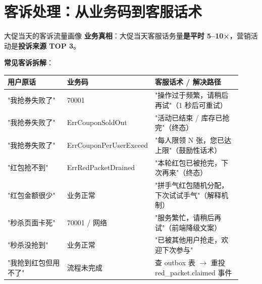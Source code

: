\documentclass[aspectratio=169,11pt]{beamer}
\begin{document}
\section{客诉处理：从业务码到客服话术}

\begin{frame}[shrink]{大促当天的客诉流量画像}
\textbf{业务真相}：大促当天客服话务量\textbf{是平时 5--10×}，营销活动是\textbf{投诉来源 TOP 3}。

\vspace{2mm}
\textbf{常见客诉拆解}：
\scriptsize
\begin{tabular}{@{}p{0.32\linewidth}p{0.20\linewidth}p{0.40\linewidth}@{}}
\toprule
用户原话 & 业务码 & 客服话术 / 解决路径 \\
\midrule
"我抢券失败了" & 70001 & "操作过于频繁，请稍后再试"（1 秒后可重试）\\
"我抢券失败了" & ErrCouponSoldOut & "活动已结束 / 库存已抢完"（终态）\\
"我抢券失败了" & ErrCouponPerUserExceed & "每人限领 N 张，您已达上限"（鼓励性话术）\\
"红包抢不到"   & ErrRedPacketDrained & "本轮红包已被抢完，下次再来"（终态）\\
"红包金额很少" & 业务正常 & "拼手气红包随机分配，下次试试手气"（解释机制）\\
"秒杀页面卡死" & 70001 / 网络 & "服务繁忙，请稍后再试"（前端降级文案）\\
"秒杀没抢到"   & 业务正常 & "已被其他用户抢走，欢迎下次参与"\\
"我抢到红包但用不了" & 流程未完成 & 查 outbox 表 $\to$ 重投 red\_packet.claimed 事件\\
\bottomrule
\end{tabular}
\vspace{2mm}
\end{frame}
\end{document}
